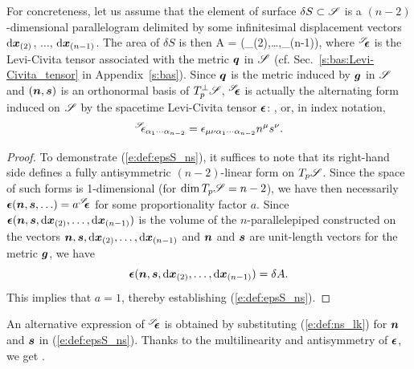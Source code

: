 For concreteness, let us assume that the element of surface $\delta S \subset\mathscr{S}$ is a $(n-2)$-dimensional
parallelogram delimited by some infinitesimal displacement vectors
$\mathrm{d}\bm{x}_{(2)}$, $\ldots$, $\mathrm{d}\bm{x}_{(n-1)}$. The area of $\delta S$ is then
\be \label{e:def:A_wepsS_dx}
    \delta A = \wepsS(\D{}_{(2)},\ldots,\D{}_{(n-1)}),
\ee
where ${}^{\mathscr{S}}\!\!\bm{\epsilon}$ is the Levi-Civita tensor
associated with the metric $\bm{q}$
in $\mathscr{S}$ (cf. Sec.~\ref{s:bas:Levi-Civita_tensor} in Appendix~\ref{s:bas}).
Since $\bm{q}$ is the metric induced by $\bm{g}$ in $\mathscr{S}$ and $(\bm{n},\bm{s})$
is an orthonormal basis of $T_p^\perp \mathscr{S}$, ${}^{\mathscr{S}}\!\!\bm{\epsilon}$ is actually the
alternating form induced on $\mathscr{S}$ by the spacetime Levi-Civita tensor
$\bm{\epsilon}$:
\be \label{e:def:epsS_ns}
    ,
\ee
or, in index notation,
\[
    {}^{\mathscr{S}}\!\!\epsilon_{\alpha_1\cdots\alpha_{n-2}} = \epsilon_{\mu\nu\alpha_1\cdots\alpha_{n-2}} n^\mu s^\nu .
\]
\begin{proof}
To demonstrate (\ref{e:def:epsS_ns}), it suffices to note that its right-hand side
defines a fully antisymmetric $(n-2)$-linear form on $T_p\mathscr{S}$. Since the space
of such forms is 1-dimensional (for $\dim T_p\mathscr{S} = n-2$), we have then
necessarily $\bm{\epsilon}(\bm{n},\bm{s},\ldots) = a {}^{\mathscr{S}}\!\!\bm{\epsilon}$ for some proportionality factor $a$. Since
$\bm{\epsilon}(\bm{n},\bm{s},\mathrm{d}\bm{x}_{(2)},\ldots,\mathrm{d}\bm{x}_{(n-1)})$ is the volume
of the $n$-parallelepiped constructed on the vectors $\bm{n},\bm{s},\mathrm{d}\bm{x}_{(2)},\ldots,\mathrm{d}\bm{x}_{(n-1)}$ and $\bm{n}$ and $\bm{s}$ are unit-length vectors for the metric $\bm{g}$,
we have
\[
    \bm{\epsilon}(\bm{n},\bm{s},\mathrm{d}\bm{x}_{(2)},\ldots,\mathrm{d}\bm{x}_{(n-1)}) = \delta A.
\]
This implies that $a=1$, thereby establishing (\ref{e:def:epsS_ns}).
\end{proof}
An alternative expression of ${}^{\mathscr{S}}\!\!\bm{\epsilon}$ is obtained by substituting (\ref{e:def:ns_lk})
for $\bm{n}$ and $\bm{s}$ in (\ref{e:def:epsS_ns}). Thanks to the multilinearity
and antisymmetry of $\bm{\epsilon}$, we get
\be
     .
\ee

